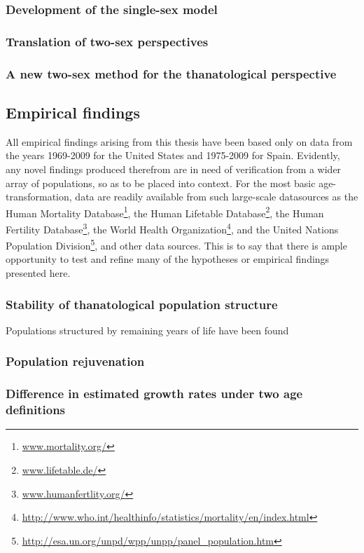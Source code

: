 \subsubsection{Development of the single-sex model}
\subsubsection{Translation of two-sex perspectives}
\subsubsection{A new two-sex method for the thanatological perspective}

\subsection{Empirical findings}
All empirical findings arising from this thesis have been based only on data
from the years 1969-2009 for the United States and 1975-2009 for Spain.
Evidently, any novel findings produced therefrom are in need of verification
from a wider array of populations, so as to be placed into context. For the most
basic age-transformation, data are readily available from such
large-scale datasources as the Human Mortality
Database\footnote{\url{www.mortality.org/}}, the Human Lifetable
Database\footnote{\url{www.lifetable.de/}}, the Human Fertility
Database\footnote{\url{www.humanfertlity.org/}}, the World Health
Organization\footnote{\url{http://www.who.int/healthinfo/statistics/mortality/en/index.html}},
and the United Nations Population
Division\footnote{\url{http://esa.un.org/unpd/wpp/unpp/panel_population.htm}},
and other data sources. This is to say that there is ample opportunity to test
and refine many of the hypotheses or empirical findings presented here.
\subsubsection{Stability of thanatological population structure}
Populations structured by remaining years of life have been found 
\subsubsection{Population rejuvenation}
\subsubsection{Difference in estimated growth rates under two age definitions}
